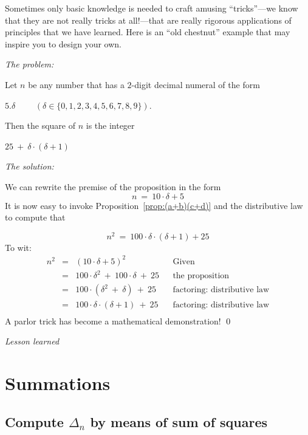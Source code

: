 Sometimes only basic knowledge is needed to craft amusing
``tricks''---we know that they are not really tricks at all!---that
are really rigorous applications of principles that we have learned.
Here is an ``old chestnut'' example that may inspire you to design
your own. 


\noindent \textit{The problem:}

Let $n$ be any number that has a $2$-digit decimal numeral of the form

\hspace{.25in}$5.\delta$ \ \ \ \ $(\delta \in \{ 0,1,2,3,4,5,6,7,8,9\})$.

\noindent
Then the square of $n$ is the integer

\hspace{.25in}$25 \ + \ \delta \cdot (\delta +1)$
\medskip

\noindent \textit{The solution:}

We can rewrite the premise of the proposition in the form
\[ n \ = \ 10 \cdot \delta + 5 \]
It is now easy to invoke Proposition~\ref{prop:(a+b)(c+d)} and the
distributive law to compute that

\[ n^2 \ = \ 100 \cdot \delta \cdot (\delta+1) + 25 \]
To wit: 
\[
\begin{array}{lclll}
n^2 & = & (10 \cdot \delta + 5)^2 & & \mbox{Given} \\
    & = & 100 \cdot \delta^2 \ + \ 100 \cdot \delta \ + \ 25
              & & \mbox{the proposition} \\
    & = & 100 \cdot (\delta^2 \ + \ \delta) \ + \ 25
              & & \mbox{factoring: distributive law} \\
    & = & 100 \cdot \delta \cdot (\delta + 1) \ + \ 25
              & & \mbox{factoring: distributive law} \\
\end{array}
\]
A parlor trick has become a mathematical demonstration!
\qed
\medskip

\noindent \textit{Lesson learned}



\section{Summations}


\subsection{Compute $\Delta_n$ by means of sum of squares}


